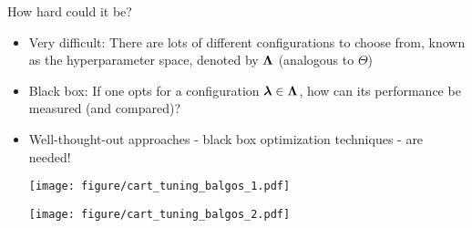 \documentclass[11pt,compress,t,notes=noshow, xcolor=table]{beamer}
\begin{document}
	\begin{vbframe}{How hard could it be?}
		\begin{itemize}
			\item \small Very difficult: There are lots of different configurations to choose from, known as the hyperparameter space, denoted by $\bm{\Lambda}$ (analogous to $\Theta$)
			\item \small Black box: If one opts for a configuration $\bm{\lambda} \in \bm{\Lambda}$, how can its performance be measured (and compared)? 
			\item \small Well-thought-out approaches - black box optimization techniques - are needed!
			
		\begin{center}
			\vspace{4em}
			\begin{minipage}{0.46\textwidth}
				\texttt{[image: figure/cart\_tuning\_balgos\_1.pdf]}
			\end{minipage}
			\begin{minipage}{0.46\textwidth}
				\texttt{[image: figure/cart\_tuning\_balgos\_2.pdf]}
			\end{minipage}
		\end{center}
		
		\end{itemize}
	\end{vbframe}
	
	\endlecture
\end{document}
